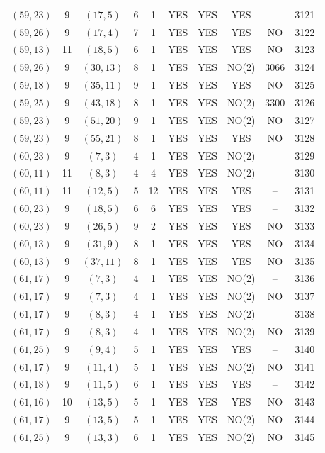 \begin{longtable}{|c|c|c|c|c|c|c|c|c|c|}
$(59, 23)$ & 9 & $(17, 5)$ & 6 & 1 & YES & YES & YES & -- & 3121\\
$(59, 26)$ & 9 & $(17, 4)$ & 7 & 1 & YES & YES & YES & NO & 3122\\
$(59, 13)$ & 11 & $(18, 5)$ & 6 & 1 & YES & YES & YES & NO & 3123\\
$(59, 26)$ & 9 & $(30, 13)$ & 8 & 1 & YES & YES & NO(2) & 3066 & 3124\\
$(59, 18)$ & 9 & $(35, 11)$ & 9 & 1 & YES & YES & YES & NO & 3125\\
$(59, 25)$ & 9 & $(43, 18)$ & 8 & 1 & YES & YES & NO(2) & 3300 & 3126\\
$(59, 23)$ & 9 & $(51, 20)$ & 9 & 1 & YES & YES & NO(2) & NO & 3127\\
$(59, 23)$ & 9 & $(55, 21)$ & 8 & 1 & YES & YES & YES & NO & 3128\\
$(60, 23)$ & 9 & $(7, 3)$ & 4 & 1 & YES & YES & NO(2) & -- & 3129\\
$(60, 11)$ & 11 & $(8, 3)$ & 4 & 4 & YES & YES & NO(2) & -- & 3130\\
$(60, 11)$ & 11 & $(12, 5)$ & 5 & 12 & YES & YES & YES & -- & 3131\\
$(60, 23)$ & 9 & $(18, 5)$ & 6 & 6 & YES & YES & YES & -- & 3132\\
$(60, 23)$ & 9 & $(26, 5)$ & 9 & 2 & YES & YES & YES & NO & 3133\\
$(60, 13)$ & 9 & $(31, 9)$ & 8 & 1 & YES & YES & YES & NO & 3134\\
$(60, 13)$ & 9 & $(37, 11)$ & 8 & 1 & YES & YES & YES & NO & 3135\\
$(61, 17)$ & 9 & $(7, 3)$ & 4 & 1 & YES & YES & NO(2) & -- & 3136\\
$(61, 17)$ & 9 & $(7, 3)$ & 4 & 1 & YES & YES & NO(2) & NO & 3137\\
$(61, 17)$ & 9 & $(8, 3)$ & 4 & 1 & YES & YES & NO(2) & -- & 3138\\
$(61, 17)$ & 9 & $(8, 3)$ & 4 & 1 & YES & YES & NO(2) & NO & 3139\\
$(61, 25)$ & 9 & $(9, 4)$ & 5 & 1 & YES & YES & YES & -- & 3140\\
$(61, 17)$ & 9 & $(11, 4)$ & 5 & 1 & YES & YES & NO(2) & NO & 3141\\
$(61, 18)$ & 9 & $(11, 5)$ & 6 & 1 & YES & YES & YES & -- & 3142\\
$(61, 16)$ & 10 & $(13, 5)$ & 5 & 1 & YES & YES & YES & NO & 3143\\
$(61, 17)$ & 9 & $(13, 5)$ & 5 & 1 & YES & YES & NO(2) & NO & 3144\\
$(61, 25)$ & 9 & $(13, 3)$ & 6 & 1 & YES & YES & NO(2) & NO & 3145\\

\end{longtable}

